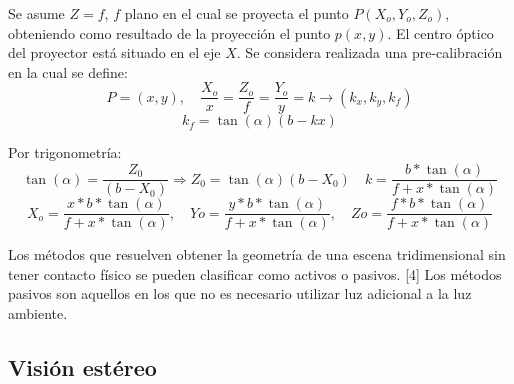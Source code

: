 Se asume $Z = f$, $f$ plano en el cual se proyecta el punto $P(X_o,Y_o,Z_o)$, obteniendo como resultado de la proyección el punto $p(x,y)$.
El centro óptico del proyector está situado en el eje $X$.
Se considera realizada una pre-calibración en la cual se define:
\[
P = (x,y), \quad \frac{X_o}{x} = \frac{Z_o}{f} = \frac{Y_o}{y} = k \to (k_x,k_y,k_f)
\]
\[
k_f = \tan (\alpha)(b - kx)
\]

Por trigonometría:
\[
\tan (\alpha) = \frac{Z_0}{(b - X_0)} \Rightarrow Z_0 = \tan (\alpha) (b - X_0) \quad k = \frac	{b * \tan (\alpha)}{f + x * \tan (\alpha)}
\]
\[
X_o = \frac{x * b * \tan (\alpha)}{f + x * \tan (\alpha)}, \quad Yo = \frac{y * b * \tan (\alpha)}{f + x * \tan (\alpha)},\quad Zo = \frac{f * b * \tan (\alpha)}{f + x * \tan (\alpha)}
\]

Los métodos que resuelven obtener la geometría de una escena tridimensional sin tener contacto físico se pueden clasificar como activos o pasivos. [4]
Los métodos pasivos son aquellos en los que no es necesario utilizar luz adicional a la luz ambiente.

\subsection{Visión estéreo}

